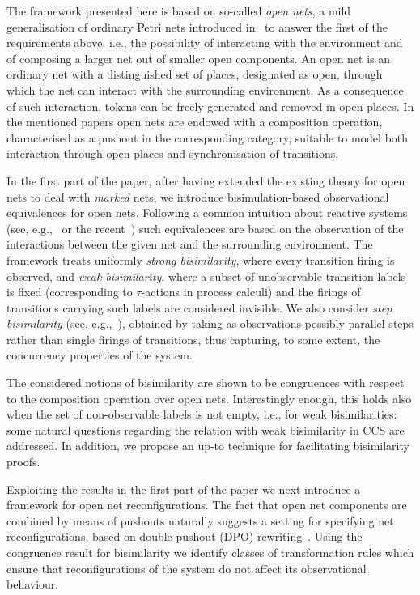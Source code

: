 \documentclass{LMCS}
\begin{document}
The framework presented here is based on so-called \emph{open nets}, a
mild generalisation of ordinary Petri nets introduced
in~\cite{BCEH:CMRS,BCEH:CSOP} to answer the first of the requirements
above, i.e., the possibility of interacting with the environment and
of composing a larger net out of smaller open components. An open net
is an ordinary net with a distinguished set of places, designated as
open, through which the net can interact with the surrounding
environment. As a consequence of such interaction, tokens can be
freely generated and removed in open places.
In the mentioned papers open nets are endowed with a composition
operation, characterised as a pushout in the corresponding category,
suitable to model both interaction through open places and
synchronisation of transitions.  


In the first part of the paper, after having extended the existing
theory for open nets to deal with \emph{marked} nets,
we introduce bisimulation-based observational equivalences for open 
nets.
Following a common intuition about reactive systems (see,
e.g.,~\cite{v:modular-petri,NPS:CBCP} or the recent~\cite{LM:DBCRS})
such equivalences are based on the observation of the interactions
between the given net and the surrounding environment.
The framework treats uniformly \emph{strong
  bisimilarity}, where every transition firing is observed, and
\emph{weak bisimilarity}, where a subset of unobservable transition
labels is fixed (corresponding to $\tau$-actions in process calculi)
and the firings of transitions carrying such labels are considered
invisible.
We also consider \emph{step bisimilarity} (see,
e.g.,~\cite{Vog:BAR,NT:DNDC}), obtained by taking as
observations possibly parallel steps rather than single firings of
transitions, thus capturing, to some extent, the concurrency
properties of the system.

The considered notions of bisimilarity are shown to be congruences
with respect to the composition operation over open
nets. Interestingly enough, this holds also when the set of
non-observable labels is not empty, i.e., for weak bisimilarities: some
natural questions regarding the relation with weak bisimilarity in CCS
are addressed. In addition, we propose an up-to technique for
facilitating bisimilarity proofs.

Exploiting the results in the first part of the paper we next introduce a
framework for open net reconfigurations.
The fact that open net components are combined by means of pushouts
naturally suggests a setting for specifying net
reconfigurations, based on double-pushout (DPO)
rewriting~\cite{Ehr:TIAA}.
Using the congruence result for bisimilarity we identify classes of
transformation rules which ensure that reconfigurations of the system
do not affect its observational behaviour.
\end{document}

